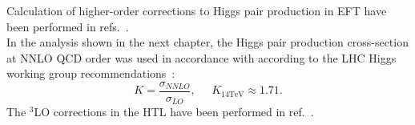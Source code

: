 %
Calculation of higher-order corrections to Higgs pair production in EFT have been performed in refs.~\cite{Grober:2014zva,Grober:2015cwa,deFlorian:2017qfk,Buchalla:2018yce}.\\ 
In the analysis shown in the next chapter, the Higgs pair production cross-section at NNLO QCD order was used in accordance with according to the LHC Higgs working group recommendations~\cite{Dittmaier:2012vm,deFlorian:2016spz}:
\begin{equation}
	K = \frac{\sigma_{NNLO}}{\sigma_{LO}}, \;\;\;\;\; K_{14 \mathrm{TeV}} \approx 1.71.
\end{equation}
The $^3$LO corrections in the HTL have been performed in ref.~\cite{Chen:2019fhs}.
